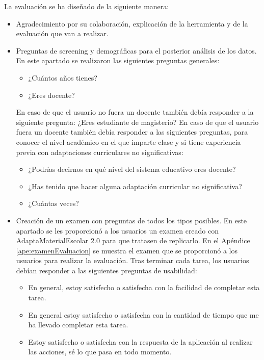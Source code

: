 La evaluación se ha diseñado de la siguiente manera:
\begin{itemize}
    \item Agradecimiento por su colaboración, explicación de la herramienta y de la evaluación que van a realizar. %
    \item Preguntas de screening y demográficas para el posterior análisis de los datos. En este apartado se realizaron las siguientes preguntas generales:
          \begin{itemize}
              \item ¿Cuántos años tienes?
              \item ¿Eres docente?
          \end{itemize}
          En caso de que el usuario no fuera un docente también debía responder a la siguiente pregunta: ¿Eres estudiante de magisterio? En caso de que el usuario fuera un docente también debía responder a las siguientes preguntas, para conocer el nivel académico en el que imparte clase y si tiene experiencia previa con adaptaciones curriculares no significativas:
          \begin{itemize}
              \item ¿Podrías decirnos en qué nivel del sistema educativo eres docente?
              \item ¿Has tenido que hacer alguna adaptación curricular no significativa?
              \item ¿Cuántas veces?
          \end{itemize}
    \item Creación de un examen con preguntas de todos los tipos posibles. En este apartado se les proporcionó a los usuarios un examen creado con AdaptaMaterialEscolar 2.0 para que tratasen de replicarlo. En el Apéndice \ref{ape:examenEvaluacion} se muestra el examen que se proporcionó a los usuarios para realizar la evaluación. Tras terminar cada tarea, los usuarios debían responder a las siguientes preguntas de usabilidad:
          \begin{itemize}
              \item En general, estoy  satisfecho o satisfecha con la facilidad de completar esta tarea.
              \item En general estoy  satisfecho o satisfecha con la cantidad de tiempo que me ha llevado completar esta tarea.
              \item Estoy  satisfecho o satisfecha con la respuesta de la aplicación al realizar las acciones, sé lo que pasa en todo momento.
          \end{itemize}


\end{itemize}
